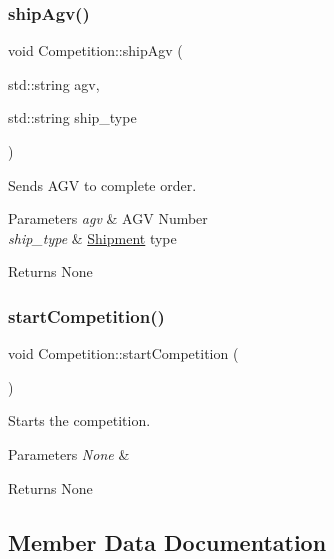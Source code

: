 \subsubsection{\texorpdfstring{ship\+Agv()}{shipAgv()}}
{\footnotesize\ttfamily void Competition\+::ship\+Agv (\begin{DoxyParamCaption}\item[{std\+::string}]{agv,  }\item[{std\+::string}]{ship\+\_\+type }\end{DoxyParamCaption})}



Sends A\+GV to complete order. 


\begin{DoxyParams}{Parameters}
{\em agv} & A\+GV Number \\
\hline
{\em ship\+\_\+type} & \hyperlink{structShipment}{Shipment} type \\
\hline
\end{DoxyParams}
\begin{DoxyReturn}{Returns}
None 
\end{DoxyReturn}
\mbox{\label{classCompetition_a2505fb69a74ff70530c033c144f7f024}} 
\subsubsection{\texorpdfstring{start\+Competition()}{startCompetition()}}
{\footnotesize\ttfamily void Competition\+::start\+Competition (\begin{DoxyParamCaption}{ }\end{DoxyParamCaption})}



Starts the competition. 


\begin{DoxyParams}{Parameters}
{\em None} & \\
\hline
\end{DoxyParams}
\begin{DoxyReturn}{Returns}
None 
\end{DoxyReturn}


\subsection{Member Data Documentation}
\mbox{\label{classCompetition_a29e55fbb84b665c374f53113cf3fa2ca}} 
